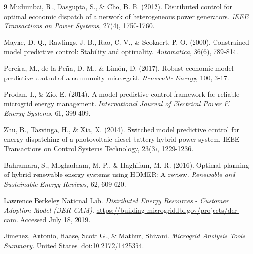 \documentclass[final,3p,times]{elsarticle}
\begin{document}
\begin{thebibliography}{9}
Mudumbai, R., Dasgupta, S., \& Cho, B. B. (2012). Distributed control for optimal economic dispatch of a network of heterogeneous power generators. \textit{IEEE Transactions on Power Systems}, 27(4), 1750-1760.

Mayne, D. Q., Rawlings, J. B., Rao, C. V., \& Scokaert, P. O. (2000). Constrained model predictive control: Stability and optimality. \textit{Automatica}, 36(6), 789-814.

Pereira, M., de la Peña, D. M., \& Limón, D. (2017). Robust economic model predictive control of a community micro-grid. \textit{Renewable Energy}, 100, 3-17.

Prodan, I., \& Zio, E. (2014). A model predictive control framework for reliable microgrid energy management. \textit{International Journal of Electrical Power \& Energy Systems}, 61, 399-409.

Zhu, B., Tazvinga, H., \& Xia, X. (2014). Switched model predictive control for energy dispatching of a photovoltaic-diesel-battery hybrid power system. IEEE Transactions on Control Systems Technology, 23(3), 1229-1236.

Bahramara, S., Moghaddam, M. P., \& Haghifam, M. R. (2016). Optimal planning of hybrid renewable energy systems using HOMER: A review. \textit{Renewable and Sustainable Energy Reviews}, 62, 609-620.

Lawrence Berkeley National Lab. \textit{Distributed Energy Resources - Customer Adoption Model (DER-CAM)}. \url{https://building-microgrid.lbl.gov/projects/der-cam}. Accessed July 18, 2019.

Jimenez, Antonio, Haase, Scott G., \& Mathur, Shivani. \textit{Microgrid Analysis Tools Summary}. United States. doi:10.2172/1425364.

\end{thebibliography}
\end{document}
